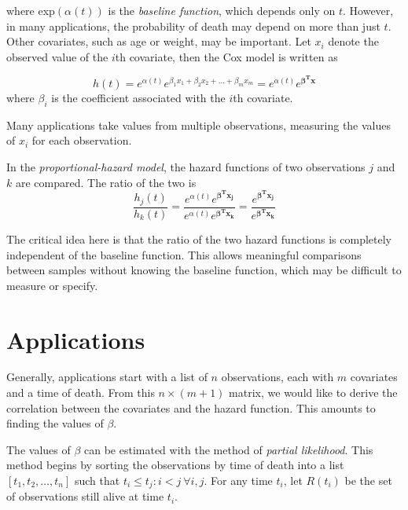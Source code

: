 where exp$(\alpha(t))$ is the \textit{baseline function}, which depends only on
$t$.  However, in many applications, the probability of death may depend on more
than just $t$.  Other covariates, such as age or weight, may be important.  Let
$x_i$ denote the observed value of the  $i$th covariate, then the Cox model is
written as

\begin{equation}
h(t) = e^{\alpha(t)} e^{\beta_1 x_1 + \beta_2 x_2 + \dots + \beta_m x_m} = e^{\alpha(t)} e^{\mathbf{\beta^T x}}
\end{equation}
where $\beta_i$ is the coefficient associated with the $i$th covariate.

Many applications take values from multiple observations, measuring the values
of $x_i$ for each observation.  %


In the \textit{proportional-hazard model}, the hazard functions of two
observations $j$ and $k$ are compared. The ratio of the two is
\begin{equation}
\frac{h_j(t)}{h_k(t)} = \frac{e^{\alpha(t)} e^{\mathbf{\beta^T x_j}} }{e^{\alpha(t)} e^{\mathbf{\beta^T x_k}} } = \frac{e^{\mathbf{\beta^T x_j} }}{ e^{\mathbf{\beta^T x_k}}}
\end{equation}

The critical idea here is that the ratio of the two hazard functions is
completely independent of the baseline function.  This allows meaningful
comparisons between samples without knowing the baseline function, which may be
difficult to measure or specify.

\section{Applications}\label{cox:Application}
Generally, applications start with a list of $n$ observations, each with $m$
covariates and a time of death.  From this $n \times (m+1)$ matrix, we would
like to derive the correlation between the covariates and the hazard function.
This amounts to finding the values of  $\beta$.

The values of $\beta$ can be estimated with the method of \textit{partial
likelihood}.  This method begins by sorting the observations by time of death
into a list $[t_1, t_2, \dots, t_n]$ such that $t_i \le t_j : i < j\ \forall
i,j$.  For any time $t_i$, let $R(t_i)$ be the set of observations still alive
at time $t_i$.

